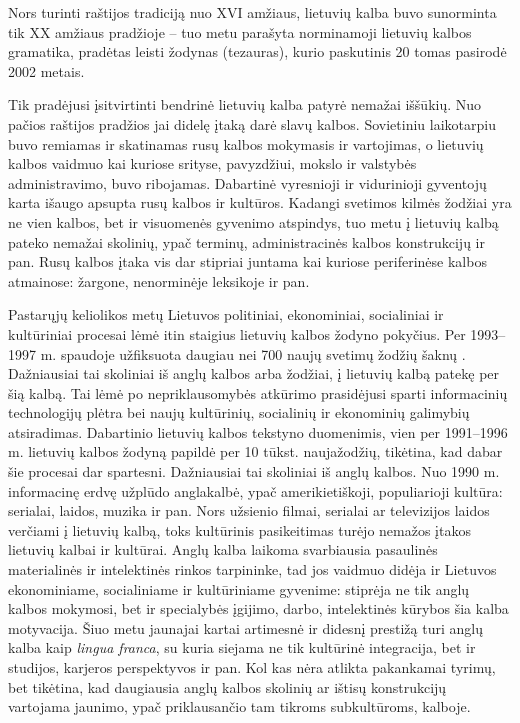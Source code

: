 \documentclass[]{../metanetpaper}
\begin{document}
\begin{multicols}{2}
Nors turinti raštijos tradiciją nuo XVI amžiaus, lietuvių kalba buvo sunorminta tik XX amžiaus pradžioje – tuo metu parašyta norminamoji lietuvių kalbos gramatika, pradėtas leisti žodynas (tezauras), kurio paskutinis 20 tomas pasirodė 2002 metais.  

    Tik pradėjusi įsitvirtinti bendrinė lietuvių kalba patyrė nemažai iššūkių. Nuo pačios raštijos pradžios jai didelę įtaką darė slavų kalbos. Sovietiniu laikotarpiu buvo remiamas ir skatinamas rusų kalbos mokymasis ir vartojimas, o lietuvių kalbos vaidmuo kai kuriose srityse, pavyzdžiui, mokslo ir valstybės administravimo, buvo ribojamas. Dabartinė vyresnioji ir vidurinioji gyventojų karta išaugo apsupta rusų kalbos ir kultūros. Kadangi svetimos kilmės žodžiai yra ne vien kalbos, bet ir visuomenės gyvenimo atspindys, tuo metu į lietuvių kalbą pateko nemažai skolinių, ypač terminų, administracinės kalbos konstrukcijų ir pan. Rusų kalbos įtaka vis dar stipriai juntama kai kuriose periferinėse kalbos atmainose: žargone, nenorminėje leksikoje ir pan.   

    Pastarųjų keliolikos metų Lietuvos politiniai, ekonominiai, socialiniai ir kultūriniai procesai lėmė itin staigius lietuvių kalbos žodyno pokyčius. Per 1993–1997 m. spaudoje užfiksuota daugiau nei 700 naujų svetimų žodžių šaknų \cite{nbi1}. Dažniausiai tai skoliniai iš anglų kalbos arba žodžiai, į lietuvių kalbą patekę per šią kalbą. Tai lėmė po nepriklausomybės atkūrimo prasidėjusi sparti informacinių technologijų plėtra bei naujų kultūrinių, socialinių ir ekonominių galimybių atsiradimas. Dabartinio lietuvių kalbos tekstyno duomenimis, vien per 1991–1996 m. lietuvių kalbos žodyną papildė per 10 tūkst. naujažodžių, tikėtina, kad dabar šie procesai dar spartesni. Dažniausiai tai skoliniai iš anglų kalbos. Nuo 1990 m. informacinę erdvę užplūdo anglakalbė, ypač amerikietiškoji, populiarioji kultūra: serialai, laidos, muzika ir pan. Nors užsienio filmai, serialai ar televizijos laidos verčiami į lietuvių kalbą, toks kultūrinis pasikeitimas turėjo nemažos įtakos lietuvių kalbai ir kultūrai. Anglų kalba laikoma svarbiausia pasaulinės materialinės ir intelektinės rinkos tarpininke, tad jos vaidmuo didėja ir Lietuvos ekonominiame, socialiniame ir kultūriniame gyvenime: stiprėja ne tik anglų kalbos mokymosi, bet ir specialybės įgijimo, darbo, intelektinės kūrybos šia kalba motyvacija. Šiuo metu jaunajai kartai artimesnė ir didesnį prestižą turi anglų kalba kaip \textit{lingua franca}, su kuria siejama ne tik kultūrinė integracija, bet ir studijos, karjeros perspektyvos ir pan. Kol kas nėra atlikta pakankamai tyrimų, bet tikėtina, kad daugiausia anglų kalbos skolinių ar ištisų konstrukcijų vartojama jaunimo, ypač priklausančio tam tikroms subkultūroms, kalboje.   


\end{multicols}
\end{document}
